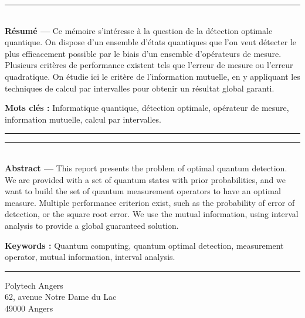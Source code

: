 \documentclass[12pt,a4paper]{report}
\newcommand\mainmatter{
    \cleardoublepage
    \pagenumbering{arabic}
}
\begin{document}
\pagebreak
\tableofcontents

\pagebreak
\listoffigures

\mainmatter





% 
% 


\begin{appendix}



\end{appendix}


\clearpage
{}



\clearpage
\thispagestyle{empty}

\vspace*{\fill}
\noindent\rule[2pt]{\textwidth}{0.5pt}\\
{\textbf{Résumé ---}}
Ce mémoire s'intéresse à la question de la détection optimale quantique. On dispose d'un ensemble d'états quantiques que l'on veut détecter le plus efficacement possible par le biais d'un ensemble d'opérateurs de mesure. Plusieurs critères de performance existent tels que l'erreur de mesure ou l'erreur quadratique. On étudie ici le critère de l'information mutuelle, en y appliquant les techniques de calcul par intervalles pour obtenir un résultat global garanti.

{\textbf{Mots clés :}}
Informatique quantique, détection optimale, opérateur de mesure, information mutuelle, calcul par intervalles.
\\
\noindent\rule[2pt]{\textwidth}{0.5pt}


\vspace*{\fill}
\noindent\rule[2pt]{\textwidth}{0.5pt}\\
{\textbf{Abstract ---}}
This report presents the problem of optimal quantum detection. We are provided with a set of quantum states with prior probabilities, and we want to build the set of quantum measurement operators to have an optimal measure. Multiple performance criterion exist, such as the probability of error of detection, or the square root error. We use the mutual information, using interval analysis to provide a global guaranteed solution. 

{\textbf{Keywords :}}
Quantum computing, quantum optimal detection, measurement operator, mutual information, interval analysis.
\\
\noindent\rule[2pt]{\textwidth}{0.5pt}

\begin{center}
  Polytech Angers\\
  62, avenue Notre Dame du Lac\\
  49000 Angers
\end{center}
\vspace*{\fill}
\end{document}
